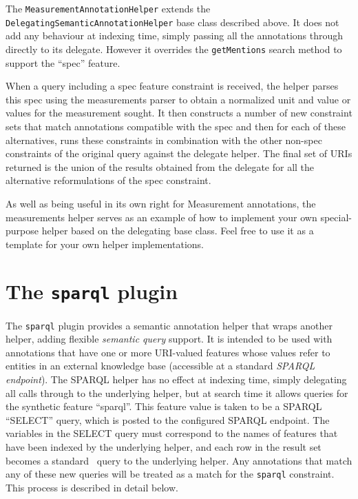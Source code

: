 The {\tt MeasurementAnnotationHelper} extends the
{\tt DelegatingSemanticAnnotationHelper} base class described above.  It does
not add any behaviour at indexing time, simply passing all the annotations
through directly to its delegate.  However it overrides the {\tt getMentions}
search method to support the ``spec'' feature.

When a query including a spec feature constraint is received, the helper parses
this spec using the measurements parser to obtain a normalized unit and value
or values for the measurement sought.  It then constructs a number of new
constraint sets that match annotations compatible with the spec and then for
each of these alternatives, runs these constraints in combination with the
other non-spec constraints of the original query against the delegate helper.
The final set of URIs returned is the union of the results obtained from the
delegate for all the alternative reformulations of the spec constraint.

As well as being useful in its own right for Measurement annotations, the
measurements helper serves as an example of how to implement your own
special-purpose helper based on the delegating base class.  Feel free to use it
as a template for your own helper implementations.

\section{The {\tt sparql} plugin}\label{sec:plugins:sparql}

The {\tt sparql} plugin provides a semantic annotation helper that wraps
another helper, adding flexible {\em semantic query} support.  It is intended
to be used with annotations that have one or more URI-valued features whose
values refer to entities in an external knowledge base (accessible at a
standard {\em SPARQL endpoint}).  The SPARQL helper has no effect at indexing
time, simply delegating all calls through to the underlying helper, but at
search time it allows queries for the synthetic feature ``sparql''.  This
feature value is taken to be a SPARQL ``SELECT'' query, which is posted
to the configured SPARQL endpoint.  The variables in the SELECT query must
correspond to the names of features that have been indexed by the underlying
helper, and each row in the result set becomes a standard \Mimir\ query to the
underlying helper.  Any annotations that match any of these new queries will be
treated as a match for the {\tt sparql} constraint.  This process is described
in detail below.

